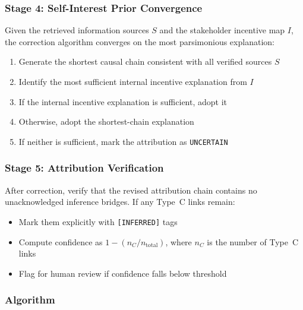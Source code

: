 \subsubsection{Stage 4: Self-Interest Prior Convergence}

Given the retrieved information sources $S$ and the stakeholder incentive map 
$I$, the correction algorithm converges on the most parsimonious explanation:

\begin{enumerate}
  \item Generate the shortest causal chain consistent with all verified sources $S$
  \item Identify the most sufficient internal incentive explanation from $I$
  \item If the internal incentive explanation is sufficient, adopt it
  \item Otherwise, adopt the shortest-chain explanation
  \item If neither is sufficient, mark the attribution as \texttt{UNCERTAIN}
\end{enumerate}

\subsubsection{Stage 5: Attribution Verification}

After correction, verify that the revised attribution chain contains no 
unacknowledged inference bridges. If any Type~C links remain:

\begin{itemize}
  \item Mark them explicitly with \texttt{[INFERRED]} tags
  \item Compute confidence as $1 - (n_C / n_{\text{total}})$, where $n_C$ is the number of Type~C links
  \item Flag for human review if confidence falls below threshold
\end{itemize}

\subsubsection{Algorithm}

